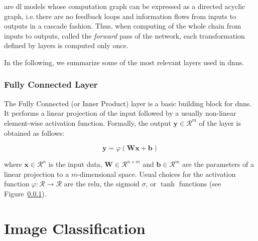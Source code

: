  are \gls{dl} models whose computation graph can be expressed as a directed acyclic graph, i.e.\,there are no feedback loops and information flows from inputs to outputs in a cascade fashion.
Thus, when computing of the whole chain from inputs to outputs, called the \emph{forward} pass of the network, each transformation defined by layers is computed only once.

In the following, we summarize some of the most relevant layers used in \glspl{dnn}.

\subsubsection{Fully Connected Layer}

The Fully Connected (or Inner Product) layer is a basic building block for \glspl{dnn}.
It performs a linear projection of the input followed by a usually non-linear element-wise activation function.
Formally, the output  $\mathbf{y} \in \mathcal{R}^m$ of the layer is obtained as follows:

\begin{equation}
    \mathbf{y} = \varphi ( \mathbf{W} \mathbf{x} + \mathbf{b} )
\end{equation}

where $\mathbf{x} \in \mathcal{R}^n$ is the input data, $\mathbf{W} \in \mathcal{R}^{n \times m}$ and $\mathbf{b} \in \mathcal{R}^m$ are the parameters of a linear projection to a $m$-dimensional space.
Usual choices for the activation function $\varphi: \mathcal{R} \to \mathcal{R}$ are the \gls{relu}, the sigmoid $\sigma$, or $\tanh$ functions (see Figure~\ref{}). %



\section{Image Classification}
\label{sec:back:image-classification}


